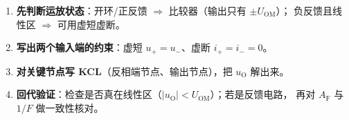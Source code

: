\documentclass[11pt]{ctexart}
\begin{document}

\begin{enumerate}
\item \textbf{先判断运放状态}：开环/正反馈 $\Rightarrow$ 比较器（输出只有 $\pm U_{\mathrm{OM}}$）；
负反馈且线性区 $\Rightarrow$ 可用虚短虚断。
\item \textbf{写出两个输入端的约束}：虚短 $u_+=u_-$、虚断 $i_+=i_-=0$。
\item \textbf{对关键节点写 KCL}（反相端节点、输出节点），把 $u_{\mathrm{O}}$ 解出来。
\item \textbf{回代验证}：检查是否真在线性区（$|u_{\mathrm{O}}|<U_{\mathrm{OM}}$）；若是反馈电路，
再对 $A_{\mathrm{F}}$ 与 $1/F$ 做一致性核对。
\end{enumerate}

\end{document}
